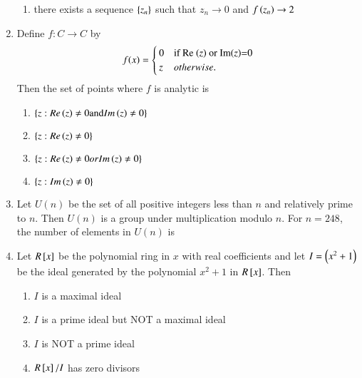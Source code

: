 \documentclass[journal]{IEEEtran}
\begin{document}
\begin{enumerate}
\begin{enumerate}
			\item there exists a sequence $\left\{z_{n}\right\}$ such that $z_{n} \rightarrow 0$ and $f\left(z_{n}\right) \rightarrow 2$
		\end{enumerate}
	\item Define $f: C \rightarrow C$ by 
         \begin{align*}
               f(x) = 
\begin{cases} 
    0 & \text{if Re \ensuremath{\left(z\right)} or Im\ensuremath{\left(z\right)}=0} \\
    z & otherwise.
\end{cases}
         \end{align*}
 Then the set of points where $f$ is analytic is
		\begin{enumerate}
			\item $\left\{z: Re \left(z\right) \neq 0 \text{and} Im \left(z\right) \neq 0\right\}$
			\item $\left\{z: Re\left(z\right) \neq 0\right\}$
			\item $\left\{z: Re \left(z\right) \neq 0 or Im \left(z\right) \neq 0\right\}$
	        \item $\left\{z: Im \left(z\right) \neq 0\right\}$
        	\end{enumerate}
	\item Let $U(n)$ be the set of all positive integers less than $n$ and relatively prime to $n$. Then $U(n)$ is a group under multiplication modulo $n$. For $n=248$, the number of elements in $U(n)$ is
		\begin{enumerate}
        	\end{enumerate}	
	\item Let $ R {}\left[x\right]$ be the polynomial ring in $x$ with real coefficients and let $I=\left( x^{2}+1\right)$ be the ideal generated by the polynomial $x^{2}+1$ in $R{}\left[x\right]$. Then
		\begin{enumerate}
			\item $I$ is a maximal ideal
			\item $I$ is a prime ideal but NOT a maximal ideal
			\item $I$ is NOT a prime ideal
			\item $R{}\left[x\right] / I$ has zero divisors
        	\end{enumerate}

\end{enumerate}
\end{document}
